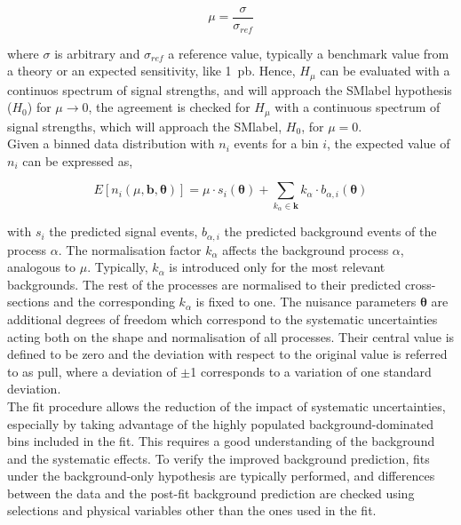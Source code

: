 \begin{equation}
    \mu = \frac{\sigma}{\sigma_{ref}}
\end{equation}

where $\sigma$ is arbitrary and $\sigma_{ref}$ a reference value, typically a benchmark value from a theory or an expected sensitivity, like 1~pb. Hence, $H_\mu$ can be evaluated with a continuos spectrum of signal strengths, and will approach the \acrshort{SMlabel} hypothesis ($H_0$) for $\mu\to0$, the agreement is checked for $H_\mu$ with a continuous spectrum of signal strengths, which will approach the \acrshort{SMlabel}, $H_0$, for $\mu=0$.\\

Given a binned data distribution with $n_i$ events for a bin $i$, the expected value of $n_i$ can be expressed as,

\begin{equation}
    E[n_i(\mu,\mathbf{b},\boldsymbol{\theta})] = \mu\cdot s_i(\boldsymbol{\theta}) + \sum_{k_{\alpha}\in\mathbf{k}}k_\alpha\cdot b_{\alpha,i}(\boldsymbol{\theta})
\end{equation}

with $s_i$ the predicted signal events, $b_{\alpha,i}$ the predicted background events of the process $\alpha$. The normalisation factor $k_\alpha$ affects the background process $\alpha$, analogous to $\mu$. Typically, $k_\alpha$ is introduced only for the most relevant backgrounds. The rest of the processes are normalised to their predicted cross-sections and the corresponding $k_\alpha$ is fixed to one. The nuisance parameters $\boldsymbol{\theta}$ are additional degrees of freedom which correspond to the systematic uncertainties acting both on the shape and normalisation of all processes. Their central value is defined to be zero and the deviation with respect to the original value is referred to as pull, where a deviation of $\pm$1 corresponds to a variation of one standard deviation.\\

The fit procedure allows the reduction of the impact of systematic uncertainties, especially by taking advantage of the highly populated background-dominated bins included in the fit. This requires a good understanding of the background and the systematic effects. To verify the improved background prediction, fits under the background-only hypothesis are typically performed, and differences between the data and the post-fit background prediction are checked using selections and physical variables other than the ones used in the fit.\\

